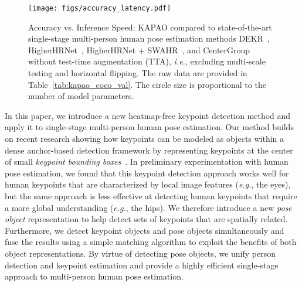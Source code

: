 \documentclass[runningheads]{llncs}
\newcommand{\eg}{\textit{e.g.}}
\newcommand{\ie}{\textit{i.e.}}
\newcommand\hlll[1]{\bgroup
  \hskip0pt\color{black}#1\egroup
}
\begin{document}
\begin{figure}[t!]
\centering
    \texttt{[image: figs/accuracy\_latency.pdf]}
\caption[Accuracy vs. Inference Speed: KAPAO compared to state-of-the-art single-stage methods.]{Accuracy vs. Inference Speed: KAPAO compared to state-of-the-art single-stage multi-person human pose estimation methods DEKR~\cite{geng2021bottom}, HigherHRNet~\cite{cheng2020higherhrnet}, HigherHRNet + SWAHR~\cite{luo2021rethinking}, and CenterGroup~\cite{braso2021center} without test-time augmentation (TTA), \ie, excluding multi-scale testing and horizontal flipping. The raw data are provided in Table~\ref{tab:kapao_coco_val}. The circle size is proportional to the number of model parameters.}
\label{fig:acc_speed}
\end{figure}

In this paper, we introduce a new heatmap-free keypoint detection method and apply it to single-stage multi-person human pose estimation. Our method builds on recent research showing how keypoints can be modeled as objects within a dense anchor-based detection framework by representing keypoints at the center of small \textit{keypoint bounding boxes}~\cite{mcnally2021deepdarts}. In preliminary experimentation with human pose estimation, we found that this keypoint detection approach works well for human keypoints that are characterized by local image features (\eg, the eyes), but the same approach is less effective at detecting human keypoints that require a more global understanding (\eg, the hips). We therefore introduce a new \textit{pose object} representation to help detect sets of keypoints that are spatially related. Furthermore, we detect keypoint objects and pose objects simultaneously and fuse the results using a simple matching algorithm to exploit the benefits of both object representations. By virtue of detecting pose objects, we unify person detection and keypoint estimation \hlll{and provide} a highly efficient single-stage approach to multi-person human pose estimation.
\end{document}

